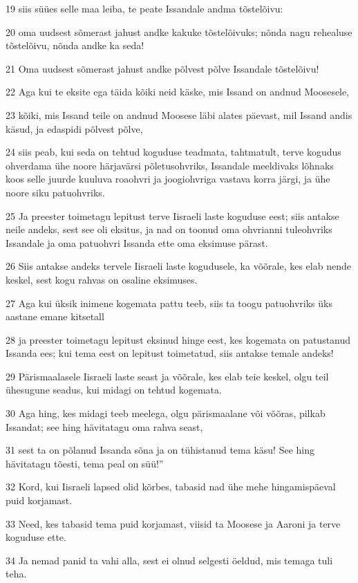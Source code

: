 \par 19 siis süües selle maa leiba, te peate Issandale andma tõstelõivu:
\par 20 oma uudsest sõmerast jahust andke kakuke tõstelõivuks; nõnda nagu rehealuse tõstelõivu, nõnda andke ka seda!
\par 21 Oma uudsest sõmerast jahust andke põlvest põlve Issandale tõstelõivu!
\par 22 Aga kui te eksite ega täida kõiki neid käske, mis Issand on andnud Moosesele,
\par 23 kõiki, mis Issand teile on andnud Moosese läbi alates päevast, mil Issand andis käsud, ja edaspidi põlvest põlve,
\par 24 siis peab, kui seda on tehtud koguduse teadmata, tahtmatult, terve kogudus ohverdama ühe noore härjavärsi põletusohvriks, Issandale meeldivaks lõhnaks koos selle juurde kuuluva roaohvri ja joogiohvriga vastava korra järgi, ja ühe noore siku patuohvriks.
\par 25 Ja preester toimetagu lepitust terve Iisraeli laste koguduse eest; siis antakse neile andeks, sest see oli eksitus, ja nad on toonud oma ohvrianni tuleohvriks Issandale ja oma patuohvri Issanda ette oma eksimuse pärast.
\par 26 Siis antakse andeks tervele Iisraeli laste kogudusele, ka võõrale, kes elab nende keskel, sest kogu rahvas on osaline eksimuses.
\par 27 Aga kui üksik inimene kogemata pattu teeb, siis ta toogu patuohvriks üks aastane emane kitsetall
\par 28 ja preester toimetagu lepitust eksinud hinge eest, kes kogemata on patustanud Issanda ees; kui tema eest on lepitust toimetatud, siis antakse temale andeks!
\par 29 Pärismaalasele Iisraeli laste seast ja võõrale, kes elab teie keskel, olgu teil ühesugune seadus, kui midagi on tehtud kogemata.
\par 30 Aga hing, kes midagi teeb meelega, olgu pärismaalane või võõras, pilkab Issandat; see hing hävitatagu oma rahva seast,
\par 31 sest ta on põlanud Issanda sõna ja on tühistanud tema käsu! See hing hävitatagu tõesti, tema peal on süü!”
\par 32 Kord, kui Iisraeli lapsed olid kõrbes, tabasid nad ühe mehe hingamispäeval puid korjamast.
\par 33 Need, kes tabasid tema puid korjamast, viisid ta Moosese ja Aaroni ja terve koguduse ette.
\par 34 Ja nemad panid ta vahi alla, sest ei olnud selgesti öeldud, mis temaga tuli teha.
